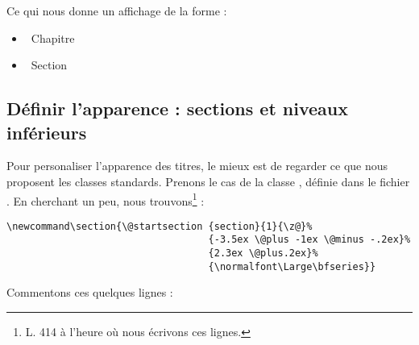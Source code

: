 Ce qui nous donne un affichage de la forme :


\begin{itemize}
\item\thechapter~Chapitre 
\item\thesection~Section
\end{itemize}


\renewcommand \thechapter {\oldthechapter}
\renewcommand \thesection {\oldthesection}


\subsection{Définir l'apparence : sections et niveaux inférieurs}\label{apparencetitre}

Pour personaliser l'apparence des titres, le mieux est de regarder ce que nous proposent les classes standards. Prenons le cas de la classe , définie dans le fichier . En cherchant un peu, nous trouvons\footnote{L. 414 à l'heure où nous écrivons ces lignes.} :

\begin{verbatim}
\newcommand\section{\@startsection {section}{1}{\z@}%
                                   {-3.5ex \@plus -1ex \@minus -.2ex}%
                                   {2.3ex \@plus.2ex}%
                                   {\normalfont\Large\bfseries}}
\end{verbatim}

Commentons ces quelques lignes :

